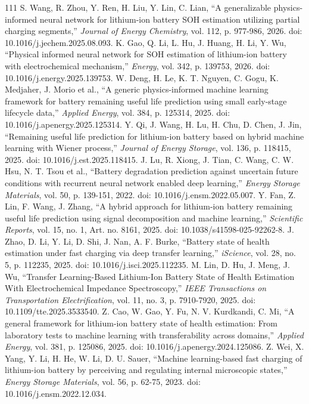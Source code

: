 \documentclass[journal]{IEEEtran}
\begin{document}
\begin{thebibliography}{111}
S. Wang, R. Zhou, Y. Ren, H. Liu, Y. Lin, C. Lian, ``A generalizable physics-informed neural network for lithium-ion battery SOH estimation utilizing partial charging segments,'' \emph{Journal of Energy Chemistry}, vol. 112, p. 977-986, 2026. doi: 10.1016/j.jechem.2025.08.093.
K. Gao, Q. Li, L. Hu, J. Huang, H. Li, Y. Wu, ``Physical informed neural network for SOH estimation of lithium-ion battery with electrochemical mechanism,'' \emph{Energy}, vol. 342, p. 139753, 2026. doi: 10.1016/j.energy.2025.139753.
W. Deng, H. Le, K. T. Nguyen, C. Gogu, K. Medjaher, J. Morio et al., ``A generic physics-informed machine learning framework for battery remaining useful life prediction using small early-stage lifecycle data,'' \emph{Applied Energy}, vol. 384, p. 125314, 2025. doi: 10.1016/j.apenergy.2025.125314.
Y. Qi, J. Wang, H. Lu, H. Chu, D. Chen, J. Jin, ``Remaining useful life prediction for lithium-ion battery based on hybrid machine learning with Wiener process,'' \emph{Journal of Energy Storage}, vol. 136, p. 118415, 2025. doi: 10.1016/j.est.2025.118415.
J. Lu, R. Xiong, J. Tian, C. Wang, C. W. Hsu, N. T. Tsou et al., ``Battery degradation prediction against uncertain future conditions with recurrent neural network enabled deep learning,'' \emph{Energy Storage Materials}, vol. 50, p. 139-151, 2022. doi: 10.1016/j.ensm.2022.05.007.
Y. Fan, Z. Lin, F. Wang, J. Zhang, ``A hybrid approach for lithium-ion battery remaining useful life prediction using signal decomposition and machine learning,'' \emph{Scientific Reports}, vol. 15, no. 1, Art. no. 8161, 2025. doi: 10.1038/s41598-025-92262-8.
J. Zhao, D. Li, Y. Li, D. Shi, J. Nan, A. F. Burke, ``Battery state of health estimation under fast charging via deep transfer learning,'' \emph{iScience}, vol. 28, no. 5, p. 112235, 2025. doi: 10.1016/j.isci.2025.112235.
M. Lin, D. Hu, J. Meng, J. Wu, ``Transfer Learning-Based Lithium-Ion Battery State of Health Estimation With Electrochemical Impedance Spectroscopy,'' \emph{IEEE Transactions on Transportation Electrification}, vol. 11, no. 3, p. 7910-7920, 2025. doi: 10.1109/tte.2025.3533540.
Z. Cao, W. Gao, Y. Fu, N. V. Kurdkandi, C. Mi, ``A general framework for lithium-ion battery state of health estimation: From laboratory tests to machine learning with transferability across domains,'' \emph{Applied Energy}, vol. 381, p. 125086, 2025. doi: 10.1016/j.apenergy.2024.125086.
Z. Wei, X. Yang, Y. Li, H. He, W. Li, D. U. Sauer, ``Machine learning-based fast charging of lithium-ion battery by perceiving and regulating internal microscopic states,'' \emph{Energy Storage Materials}, vol. 56, p. 62-75, 2023. doi: 10.1016/j.ensm.2022.12.034.

\end{thebibliography}
\end{document}
